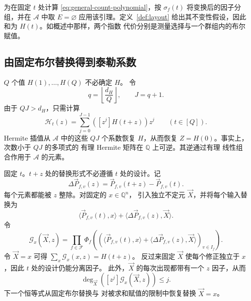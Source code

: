 \documentclass[11pt,reqno]{amsart}
\numberwithin{equation}{section}
\theoremstyle{definition}\newtheorem{definition}[theorem]{定义}
\theoremstyle{remark}\newtheorem{remark}[theorem]{注}
\renewcommand{\le}{\leqslant}
\begin{document}
为在固定 $t$ 处计算 \eqref{eq:general-count-polynomial}，按 $\sigma_f(t)$
将变换后的因子分组，并在
$\mathcal A$ 中取 $E=\varnothing$ 应用该引理。定义~\ref{def:layout}
给出其不变性假设，因此和为 $H(t)$。如概述中那样，两个指数
代价分别是测量选择与一个群组内的布尔赋值。

\subsection{由固定布尔替换得到泰勒系数}
\label{subsec:fixed-boolean-substitutions}
$Q$ 个值 $H(1),\ldots,H(Q)$ 不必确定 $H$。
令
\begin{equation}\label{eq:hasse-order}
 q=\left\lfloor\frac{d_H}{Q}\right\rfloor,\qquad J=q+1.
\end{equation}
由于 $QJ>d_H$，只需计算
\begin{equation}\label{eq:taylor-truncation}
 \mathcal H_t(z)=\sum_{j=0}^{J-1}([z^j]H(t+z))z^j
 \qquad(t\in[Q]).
\end{equation}
Hermite 插值从 $\mathcal A$ 中的这些
$QJ$ 个系数恢复 $H$，从而恢复 $Z=H(0)$。事实上，次数小于 $QJ$ 的多项式的
有理 Hermite 矩阵在
$\mathbb Q$ 上可逆。其逆通过有理
线性组合作用于 $\mathcal A$ 的元素。

固定 $t$。$t+z$ 处的替换形式不必遵循
$t$ 处的设计。记
\[
 \Delta\vec P_{f,v}(z)=\vec P_{f,v}(t+z)-\vec P_{f,v}(t).
\]
每个元素都能被 $z$ 整除。对固定的 $x\in\mathbb Q^n$，
引入独立不定元 $\vec X$，并将每个输入替换为
\begin{equation}\label{eq:jet-substitution}
 \langle\vec P_{f,v}(t),x\rangle
       +\langle\Delta\vec P_{f,v}(z),\vec X\rangle.
\end{equation}
令
\begin{equation}\label{eq:auxiliary-polynomial}
 \mathcal G_x(\vec X,z)=\prod_{f\in\mathcal F}
 \Phi_f\!\left(
  (\langle\vec P_{f,v}(t),x\rangle+
   \langle\Delta\vec P_{f,v}(z),\vec X\rangle)_{v\in I_f}\right).
\end{equation}
令 $\vec X=x$ 可得
$\sum_x\mathcal G_x(x,z)=H(t+z)$。
反过来固定 $\vec X$ 使每个修正独立于
$x$，因此 $t$ 处的设计仍能分离因子。
此外，$\vec X$ 的每次出现都带有一个 $z$ 因子，从而
\begin{equation}\label{eq:degree-cost}
 \deg_{\vec X}([z^j]\mathcal G_x(\vec X,z))\le j.
\end{equation}
下一个恒等式从固定布尔替换与
对被求和赋值的限制中恢复替换 $\vec X=x$。
\end{document}
